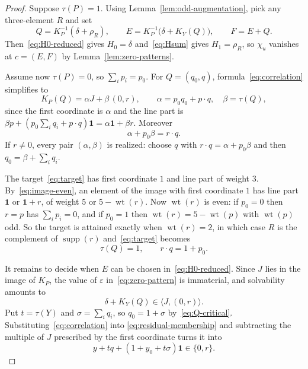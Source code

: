 \documentclass[11pt,a4paper,reqno]{amsart}
\theoremstyle{definition}
\theoremstyle{remark}
\newcommand{\supp}{\operatorname{supp}}
\newcommand{\wt}{\operatorname{wt}}
\newcommand{\one}{\mathbf 1}
\begin{document}
\begin{proof}
Suppose $\tau(P)=1$.  Using Lemma~\ref{lem:odd-augmentation}, pick any
three-element $R$ and set
\[
 Q=K_P^{-1}(\delta+\rho_R),
 \qquad
 E=K_P^{-1}\bigl(\delta+K_Y(Q)\bigr),
 \qquad F=E+Q .
\]
Then~\eqref{eq:H0-reduced} gives $H_0=\delta$ and~\eqref{eq:Hsum} gives
$H_1=\rho_R$, so $\chi_u$ vanishes at $c=(E,F)$ by
Lemma~\ref{lem:zero-patterns}.

Assume now $\tau(P)=0$, so $\sum_ip_i=p_0$.  For $Q=(q_0,q)$,
formula~\eqref{eq:correlation} simplifies to
\begin{equation}\label{eq:image-even}
 K_P(Q)=\alpha J+\beta\,(0,r),
 \qquad
 \alpha=p_0q_0+p\cdot q,\quad \beta=\tau(Q),
\end{equation}
since the first coordinate is $\alpha$ and the line part is
$\beta p+(p_0\sum_iq_i+p\cdot q)\one=\alpha\one+\beta r$.  Moreover
\begin{equation}\label{eq:alpha-beta}
 \alpha+p_0\beta=r\cdot q .
\end{equation}
If $r\neq0$, every pair $(\alpha,\beta)$ is realized: choose $q$ with
$r\cdot q=\alpha+p_0\beta$ and then $q_0=\beta+\sum_iq_i$.

The target~\eqref{eq:target} has first coordinate $1$ and line part of
weight $3$.  By~\eqref{eq:image-even}, an element of the image with
first coordinate $1$ has line part $\one$ or $\one+r$, of weight $5$ or
$5-\wt(r)$.  Now $\wt(r)$ is even: if $p_0=0$ then $r=p$ has
$\sum_ip_i=0$, and if $p_0=1$ then $\wt(r)=5-\wt(p)$ with $\wt(p)$
odd.  So the target is attained exactly when $\wt(r)=2$, in which case
$R$ is the complement of $\supp(r)$ and~\eqref{eq:target} becomes
\begin{equation}\label{eq:Q-critical}
 \tau(Q)=1,\qquad r\cdot q=1+p_0 .
\end{equation}

It remains to decide when $E$ can be chosen in~\eqref{eq:H0-reduced}.
Since $J$ lies in the image of $K_P$, the value of $\varepsilon$
in~\eqref{eq:zero-pattern} is immaterial, and solvability amounts to
\begin{equation}\label{eq:residual-membership}
 \delta+K_Y(Q)\in\langle J,(0,r)\rangle .
\end{equation}
Put $t=\tau(Y)$ and $\sigma=\sum_iq_i$, so $q_0=1+\sigma$
by~\eqref{eq:Q-critical}.  Substituting~\eqref{eq:correlation} into
\eqref{eq:residual-membership} and subtracting the multiple of $J$
prescribed by the first coordinate turns it into
\begin{equation}\label{eq:critical-affine}
 y+tq+(1+y_0+t\sigma)\one\in\{0,r\} .
\end{equation}


\end{proof}
\end{document}
